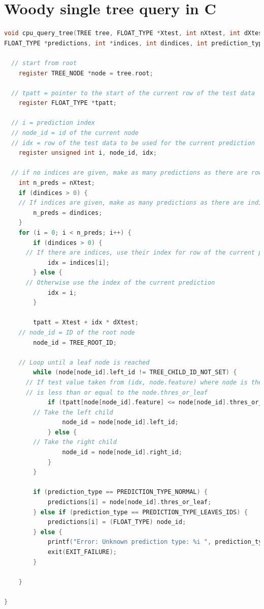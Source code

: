 \documentclass[a4paper]{article}
\begin{document}
\appendix
\section{Woody single tree query in C}
\begin{lstlisting}[language=C,breaklines]
void cpu_query_tree(TREE tree, FLOAT_TYPE *Xtest, int nXtest, int dXtest,
FLOAT_TYPE *predictions, int *indices, int dindices, int prediction_type) {

  // start from root
	register TREE_NODE *node = tree.root;

  // tpatt = pointer to the start of the current row of the test data
	register FLOAT_TYPE *tpatt;

  // i = prediction index
  // node_id = id of the current node
  // idx = row of the test data to be used for the current prediction
	register unsigned int i, node_id, idx;

  // if no indices are given, make as many predictions as there are rows in the test data
	int n_preds = nXtest;
	if (dindices > 0) {
    // If indices are given, make as many predictions as there are indices
		n_preds = dindices;
	}
	for (i = 0; i < n_preds; i++) {
		if (dindices > 0) {
      // If there are indices, use their index for row of the current prediction
			idx = indices[i];
		} else {
      // Otherwise use the index of the current prediction
			idx = i;
		}

		tpatt = Xtest + idx * dXtest;
    // node_id = ID of the root node
		node_id = TREE_ROOT_ID;

    // Loop until a leaf node is reached
		while (node[node_id].left_id != TREE_CHILD_ID_NOT_SET) {
      // If test value taken from (idx, node.feature) where node is the current node
      // is less than or equal to the node.thres_or_leaf
			if (tpatt[node[node_id].feature] <= node[node_id].thres_or_leaf) {
        // Take the left child
				node_id = node[node_id].left_id;
			} else {
        // Take the right child
				node_id = node[node_id].right_id;
			}
		}

		if (prediction_type == PREDICTION_TYPE_NORMAL) {
			predictions[i] = node[node_id].thres_or_leaf;
		} else if (prediction_type == PREDICTION_TYPE_LEAVES_IDS) {
			predictions[i] = (FLOAT_TYPE) node_id;
		} else {
			printf("Error: Unknown prediction type: %i ", prediction_type);
			exit(EXIT_FAILURE);
		}

	}

}
\end{lstlisting}
\end{document}
